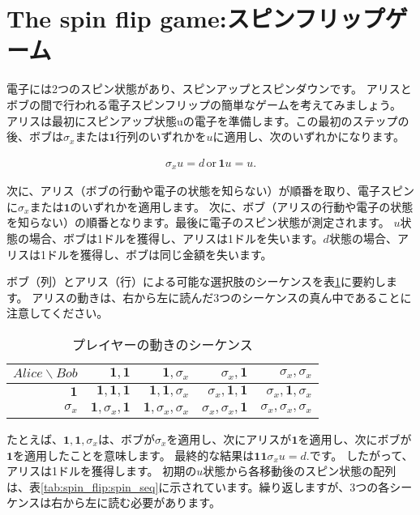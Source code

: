 \section{The spin flip game:スピンフリップゲーム}
\label{sec:the_spin_flip_game}

電子には2つのスピン状態があり、スピンアップとスピンダウンです。
アリスとボブの間で行われる電子スピンフリップの簡単なゲームを考えてみましょう。
アリスは最初にスピンアップ状態uの電子を準備します。この最初のステップの後、ボブは$\sigma_x$または$\mathbf{1}$行列のいずれかを$u$に適用し、次のいずれかになります。

\begin{align}
\sigma_x u = d \, \text{or} \, \mathbf{1}u = u.
\end{align}

次に、アリス（ボブの行動や電子の状態を知らない）が順番を取り、電子スピンに$\sigma_x$または$\mathbf{1}$のいずれかを適用します。
次に、ボブ（アリスの行動や電子の状態を知らない）の順番となります。最後に電子のスピン状態が測定されます。
$u$状態の場合、ボブは1ドルを獲得し、アリスは1ドルを失います。$d$状態の場合、アリスは1ドルを獲得し、ボブは同じ金額を失います。

ボブ（列）とアリス（行）による可能な選択肢のシーケンスを表\ref{tab:spin_flip:player_seq}に要約します。
アリスの動きは、右から左に読んだ3つのシーケンスの真ん中であることに注意してください。

\begin{table}[H]
\caption{プレイヤーの動きのシーケンス}
\label{tab:spin_flip:player_seq}
\centering
  \begin{tabular}{|r||r|r|r|r|} \hline
    $Alice \backslash Bob$ & $\mathbf{1}, \mathbf{1}$  &  $\mathbf{1}, \sigma_x $  & $ \sigma_x,\mathbf{1} $ & $\sigma_x, \sigma_x $  \\ \hline \hline
    $\mathbf{1}$ & $\mathbf{1}, \mathbf{1},\mathbf{1}$ & $\mathbf{1}, \mathbf{1},\sigma_x$ & $\sigma_x, \mathbf{1},\mathbf{1}$ & $\sigma_x, \mathbf{1},\sigma_x$ \\
    $\sigma_x$ & $\mathbf{1}, \sigma_x,\mathbf{1}$ & $ \mathbf{1}, \sigma_x,\sigma_x$ & $\sigma_x, \sigma_x,\mathbf{1}$ & $\sigma_x, \sigma_x,\sigma_x$\\ \hline
  \end{tabular}
\end{table}

たとえば、$\mathbf{1},\mathbf{1}, \sigma_x$は、ボブが$\sigma_x$を適用し、次にアリスが$\mathbf{1}$を適用し、次にボブが$\mathbf{1}$を適用したことを意味します。
最終的な結果は$\mathbf{11} \sigma_x u = d.$です。
したがって、アリスは1ドルを獲得します。
初期の$u$状態から各移動後のスピン状態の配列は、表\ref{tab:spin_flip:spin_seq}に示されています。繰り返しますが、3つの各シーケンスは右から左に読む必要があります。

